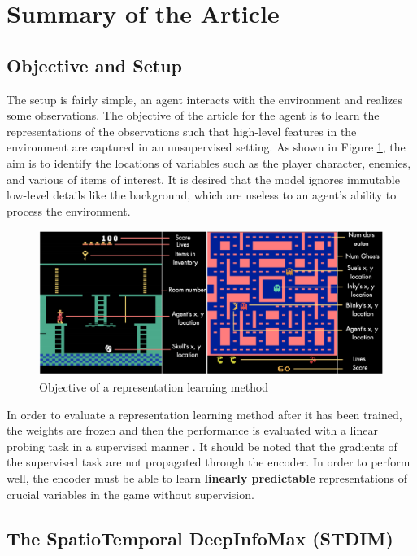 \section{Summary of the Article}
\label{section:summary}

\subsection{Objective and Setup}
The setup is fairly simple, an agent interacts with the environment and realizes some observations. The objective of the article for the agent is to learn the representations of the observations such that high-level features in the environment are captured in an unsupervised setting. As shown in Figure \ref{fig:objective}, the aim is to identify the locations of variables such as the player character, enemies, and various of items of interest. It is desired that the model ignores immutable low-level details like the background, which are useless to an agent's ability to process the environment.

\begin{figure}[H]
    \centering
    \includegraphics[scale=0.44]{../openreview/objective.PNG}
    \caption{Objective of a representation learning method}
    \label{fig:objective}
\end{figure}

In order to evaluate a representation learning method after it has been trained, the weights are frozen and then the performance is evaluated with a linear probing task in a supervised manner \cite{linear_probing}. It should be noted that the gradients of the supervised task are not propagated through the encoder. In order to perform well, the encoder must be able to learn \textbf{linearly predictable} representations of crucial variables in the game without supervision.

\subsection{The SpatioTemporal DeepInfoMax (STDIM)}
\label{section:stdim}

